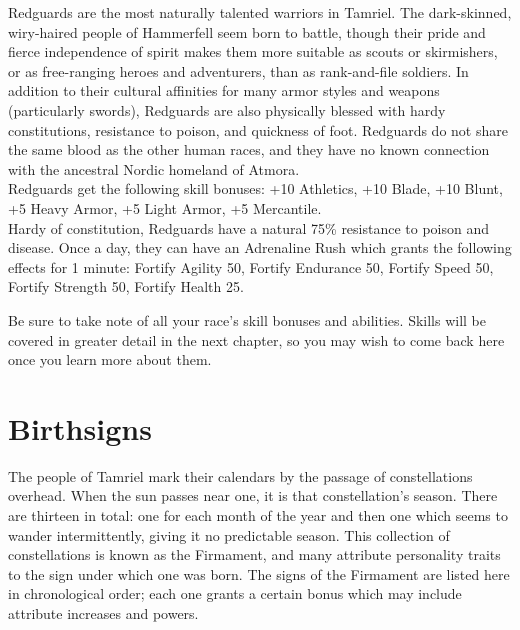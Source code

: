 \documentclass[12pt]{book}
\begin{document}
Redguards are the most naturally talented warriors in Tamriel. The dark-skinned, wiry-haired people of Hammerfell seem born to battle, though their pride and fierce independence of spirit makes them more suitable as scouts or skirmishers, or as free-ranging heroes and adventurers, than as rank-and-file soldiers. In addition to their cultural affinities for many armor styles and weapons (particularly swords), Redguards are also physically blessed with hardy constitutions, resistance to poison, and quickness of foot. Redguards do not share the same blood as the other human races, and they have no known connection with the ancestral Nordic homeland of Atmora.\\

Redguards get the following skill bonuses: +10 Athletics, +10 Blade, +10 Blunt, +5 Heavy Armor, +5 Light Armor, +5 Mercantile.\\

Hardy of constitution, Redguards have a natural 75\% resistance to poison and disease. Once a day, they can have an Adrenaline Rush which grants the following effects for 1 minute: Fortify Agility 50, Fortify Endurance 50, Fortify Speed 50, Fortify Strength 50, Fortify Health 25.\\

\begin{tcolorbox}
Be sure to take note of all your race's skill bonuses and abilities. Skills will be covered in greater detail in the next chapter, so you may wish to come back here once you learn more about them.
\end{tcolorbox}

\section{Birthsigns}
The people of Tamriel mark their calendars by the passage of constellations overhead. When the sun passes near one, it is that constellation's season. There are thirteen in total: one for each month of the year and then one which seems to wander intermittently, giving it no predictable season. This collection of constellations is known as the Firmament, and many attribute personality traits to the sign under which one was born. The signs of the Firmament are listed here in chronological order; each one grants a certain bonus which may include attribute increases and powers.
\end{document}
